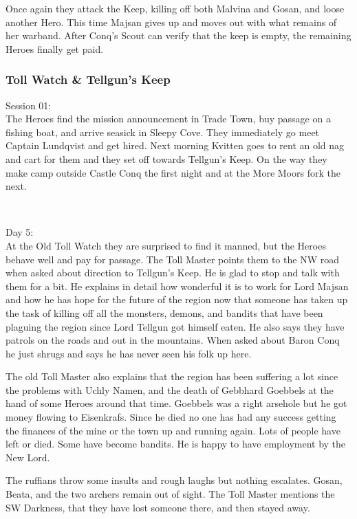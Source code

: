 Once again they attack the Keep, killing off both Malvina and Gosan, and loose another Hero. This time Majsan gives up and moves out with what remains of her warband.
After Conq's Scout can verify that the keep is empty, the remaining Heroes finally get paid.


\subsubsection*{Toll Watch \& Tellgun's Keep}
\forceindent Session 01:\\                                              %
The Heroes find the mission announcement in Trade Town, buy passage on a fishing boat, and arrive seasick in Sleepy Cove. They immediately go meet Captain Lundqvist and get hired.
Next morning Kvitten goes to rent an old nag and cart for them and they set off towards Tellgun's Keep. On the way they make camp outside Castle Conq the first night and at the More Moors fork the next.

\

Day 5:\\
At the Old Toll Watch they are surprised to find it manned, but the Heroes behave well and pay for passage. The Toll Master points them to the NW road when asked about direction to Tellgun's Keep. He is glad to stop and talk with them for a bit. He explains in detail how wonderful it is to work for Lord Majsan and how he has hope for the future of the region now that someone has taken up the task of killing off all the monsters, demons, and bandits that have been plaguing the region since Lord Tellgun got himself eaten. He also says they have patrols on the roads and out in the mountains. When asked about Baron Conq he just shrugs and says he has never seen his folk up here.

The old Toll Master also explains that the region has been suffering a lot since the problems with Uchly Namen, and the death of Gebbhard Goebbels at the hand of some Heroes around that time. Goebbels was a right arsehole but he got money flowing to Eisenkrafs. Since he died no one has had any success getting the finances of the mine or the town up and running again. Lots of people have left or died. Some have become bandits. He is happy to have employment by the New Lord.

The ruffians throw some insults and rough laughs but nothing escalates. Gosan, Beata, and the two archers remain out of sight. The Toll Master mentions the SW Darkness, that they have lost someone there, and then stayed away.

